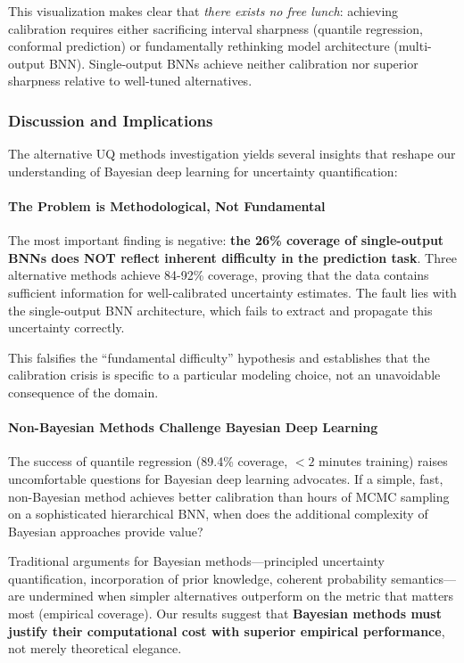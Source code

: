 This visualization makes clear that \textit{there exists no free lunch}: achieving calibration requires either sacrificing interval sharpness (quantile regression, conformal prediction) or fundamentally rethinking model architecture (multi-output BNN). Single-output BNNs achieve neither calibration nor superior sharpness relative to well-tuned alternatives.

\subsubsection{Discussion and Implications}

The alternative UQ methods investigation yields several insights that reshape our understanding of Bayesian deep learning for uncertainty quantification:

\paragraph{The Problem is Methodological, Not Fundamental}

The most important finding is negative: \textbf{the 26\% coverage of single-output BNNs does NOT reflect inherent difficulty in the prediction task}. Three alternative methods achieve 84-92\% coverage, proving that the data contains sufficient information for well-calibrated uncertainty estimates. The fault lies with the single-output BNN architecture, which fails to extract and propagate this uncertainty correctly.

This falsifies the ``fundamental difficulty'' hypothesis and establishes that the calibration crisis is specific to a particular modeling choice, not an unavoidable consequence of the domain.

\paragraph{Non-Bayesian Methods Challenge Bayesian Deep Learning}

The success of quantile regression (89.4\% coverage, $<2$ minutes training) raises uncomfortable questions for Bayesian deep learning advocates. If a simple, fast, non-Bayesian method achieves better calibration than hours of MCMC sampling on a sophisticated hierarchical BNN, when does the additional complexity of Bayesian approaches provide value?

Traditional arguments for Bayesian methods—principled uncertainty quantification, incorporation of prior knowledge, coherent probability semantics—are undermined when simpler alternatives outperform on the metric that matters most (empirical coverage). Our results suggest that \textbf{Bayesian methods must justify their computational cost with superior empirical performance}, not merely theoretical elegance.

